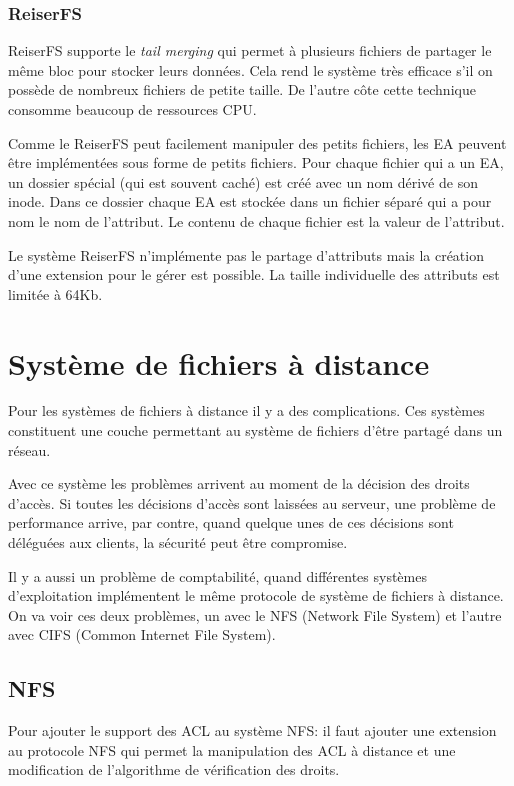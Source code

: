\documentclass{article}
\begin{document}
\subsubsection{ReiserFS}

ReiserFS supporte le \emph{tail merging} qui permet à plusieurs fichiers de partager le même bloc pour stocker leurs données. Cela rend le système très efficace s'il on possède de nombreux fichiers de petite taille. De l'autre côte cette technique consomme beaucoup de ressources CPU. 
	
Comme le ReiserFS peut facilement manipuler des petits fichiers, les EA peuvent être implémentées sous forme de petits fichiers. Pour chaque fichier qui a un EA, un dossier spécial (qui est souvent caché) est créé avec un nom dérivé de son inode. Dans ce dossier chaque EA est stockée dans un fichier séparé qui a pour nom le nom de l'attribut. Le contenu de chaque fichier est la valeur de l'attribut.

Le système ReiserFS n'implémente pas le partage d'attributs mais la création d'une extension pour le gérer est possible. La taille individuelle des attributs est limitée à 64Kb.

\section{Système de fichiers à distance}
Pour les systèmes de fichiers à distance il y a des complications. Ces systèmes constituent une couche permettant au système de fichiers d'être partagé dans un réseau. 

Avec ce système les problèmes arrivent au moment de la décision des droits d'accès. Si toutes les décisions d'accès sont laissées au serveur, une problème de performance arrive, par contre, quand quelque unes de ces décisions sont déléguées aux clients, la sécurité peut être compromise. 

Il y a aussi un problème de comptabilité, quand différentes systèmes d'exploitation implémentent le même protocole de système de fichiers à distance. On va voir ces deux problèmes, un avec le NFS (Network File System) et l'autre avec CIFS (Common Internet File System). 

\subsection{NFS}
Pour ajouter le support des ACL au système NFS: il faut ajouter une extension au protocole NFS qui permet la manipulation des ACL à distance et une modification de  l'algorithme de vérification des droits.
\end{document}
